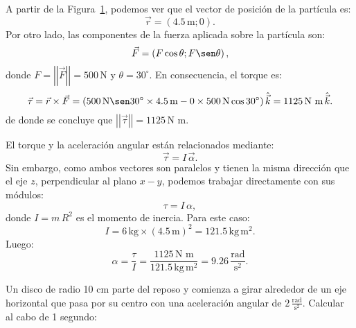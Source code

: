 \documentclass[addpoints]{exam}
\newcommand{\grado}[0]{^{\circ}}
\newcommand{\norm}[1]{\left\vert\left\vert #1 \right\vert\right\vert}
\begin{document}
\begin{questions}
    \begin{figure}[ht]
    \centering
    \caption{ }
    \label{fig:torque}
    \end{figure}

    \begin{solution}
    A partir de la Figura~\ref{fig:torque}, podemos ver que el vector de posición de la partícula es: $$\vec{r} = (4.5 \, \text{m} ; 0). $$ Por otro lado, las componentes de la fuerza aplicada sobre la partícula son: $$\vec{F} = \left(F \cos \theta; F \sen \theta \right),$$ donde $F = \norm{\vec{F}} = 500 \, \text{N}$ y $\theta = 30\grado$. En consecuencia, el torque es: $$ \vec{\tau} = \vec{r} \times \vec{F} = \left(500 \, \text{N} \sen 30\grado \times 4.5 \, \text{m} - 0 \times 500 \, \text{N} \cos 30\grado\right) \hat{\vec{k}} = 1125 \, \text{N m} \, \hat{\vec{k}}. $$ de donde se concluye que $\norm{\vec{\tau}} = 1125 \, \text{N m}$.

    El torque y la aceleración angular están relacionados mediante: $$ \vec{\tau} = I \, \vec{\alpha}. $$ Sin embargo, como ambos vectores son paralelos y tienen la misma dirección que el eje $z$, perpendicular al plano $x-y$, podemos trabajar directamente con sus módulos: $$ \tau = I \, \alpha, $$ donde $I = m \, R^2$ es el momento de inercia. Para este caso: $$ I = 6 \, \text{kg} \times \left(4.5 \, \text{m}\right)^2 = 121.5 \, \text{kg} \, \text{m}^2. $$ Luego: $$\alpha = \frac{\tau}{I} = \frac{1125 \, \text{N m}}{121.5 \, \text{kg} \, \text{m}^2} = 9.26 \, \frac{\text{rad}}{\text{s}^2}.$$
    \end{solution}

    \question Un disco de radio 10 cm parte del reposo y comienza a girar alrededor de un eje horizontal que pasa por su centro con una aceleración angular de $2 \, \frac{\text{rad}}{\text{s}^2}$. Calcular al cabo de 1 segundo:
    \begin{parts}

\end{parts}
\end{questions}
\end{document}
